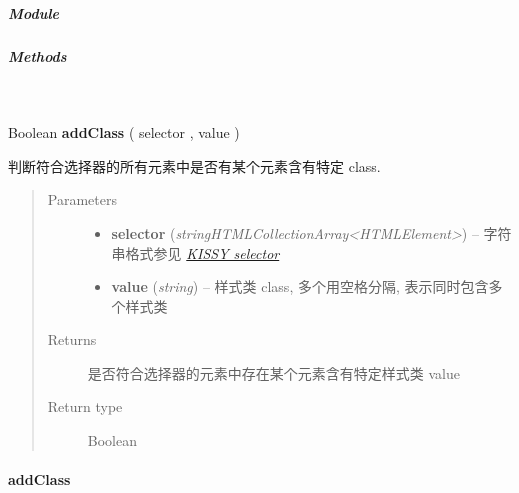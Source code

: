 \documentclass[letterpaper,10pt,english]{sphinxmanual}
\begin{document}
\subparagraph{Module}
\label{api/core/dom/hasClass:module}\begin{quote}

{\hyperref[api/core/dom/index:module-DOM]{}}
\end{quote}


\subparagraph{Methods}
\label{api/core/dom/hasClass:methods}

\begin{fulllineitems}
\label{api/core/dom/hasClass:DOM.hasClass}~
\begin{DUlineblock}{0em}
\item[] Boolean \textbf{addClass} ( selector , value )
\item[] 判断符合选择器的所有元素中是否有某个元素含有特定 class.
\end{DUlineblock}
\begin{quote}\begin{description}
\item[{Parameters}] \leavevmode\begin{itemize}
\item {}
\textbf{selector} (\emph{string\textbar{}HTMLCollection\textbar{}Array\textless{}HTMLElement\textgreater{}}) -- 字符串格式参见 {\hyperref[api/core/dom/selector:dom-selector]{\emph{KISSY selector}}}

\item {}
\textbf{value} (\emph{string}) -- 样式类 class, 多个用空格分隔, 表示同时包含多个样式类

\end{itemize}

\item[{Returns}] \leavevmode
是否符合选择器的元素中存在某个元素含有特定样式类 value

\item[{Return type}] \leavevmode
Boolean

\end{description}\end{quote}

\end{fulllineitems}



\paragraph{addClass}
\label{api/core/dom/addClass::doc}\label{api/core/dom/addClass:addclass}
\end{document}
